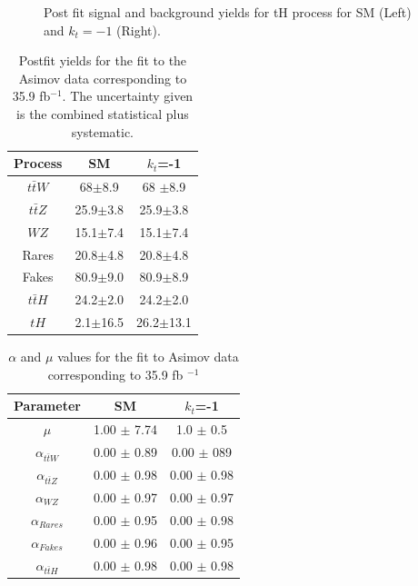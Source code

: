 \begin{figure}[!htbp]
\begin{minipage}[b]{0.48\textwidth}
		\end{minipage}
		\caption{Post fit signal and background yields for tH process for SM (Left) and $k_t=-1$ (Right).
		}
		\label{simple}
	\end{figure}
	
	\begin{table}[ht!]
		\centering
		\caption{Postfit yields for the fit to the Asimov data corresponding to 35.9 fb$^{-1}$. The uncertainty given is the combined statistical plus systematic.}
		\begin{tabular}{ccc}
			\hline
			Process & SM & $k_{t}$=-1 \\
			\hline
			$t\bar{t}W$ & 68$\pm$8.9& 68 $\pm$8.9 \\
			$t\bar{t}Z$ & 25.9$\pm$3.8&25.9$\pm$3.8\\
			$WZ$ & 15.1$\pm$7.4& 15.1$\pm$7.4\\
			Rares & 20.8$\pm$4.8& 20.8$\pm$4.8 \\
			Fakes & 80.9$\pm$9.0& 80.9$\pm$8.9 \\
			$t\bar{t}H$ & 24.2$\pm$2.0 & 24.2$\pm$2.0 \\
			\hline
			$tH$& 2.1$\pm$16.5 &26.2$\pm$13.1 
		\end{tabular}
		\label{table1}
	\end{table}
	
	
	\begin{table}[ht!]
		\small
		\centering
		\caption{$\alpha$ and $\mu$ values for the fit to Asimov data corresponding to 35.9 fb $^{-1}$}
		\begin{tabular}{ccc}
			\hline
			Parameter & SM &$k_t$=-1\\
			\hline
			$\mu$ & 1.00 $\pm$ 7.74& 1.0 $\pm$ 0.5\\
			$\alpha_{t\bar{t}W}$& 0.00 $\pm$ 0.89& 0.00 $\pm$ 089\\
			$\alpha_{t\bar{t}Z}$ & 0.00 $\pm$ 0.98& 0.00 $\pm$ 0.98\\
			$\alpha_{WZ}$ & 0.00 $\pm$ 0.97& 0.00 $\pm$ 0.97\\
			$\alpha_{Rares}$ &0.00 $\pm$ 0.95&0.00 $\pm$ 0.98 \\
			$\alpha_{Fakes}$ & 0.00 $\pm$ 0.96& 0.00 $\pm$ 0.95\\
			$\alpha_{t\bar{t}H}$ &0.00 $\pm$ 0.98& 0.00 $\pm$ 0.98\\
		\end{tabular}
		\label{parameters}
	\end{table}
	
